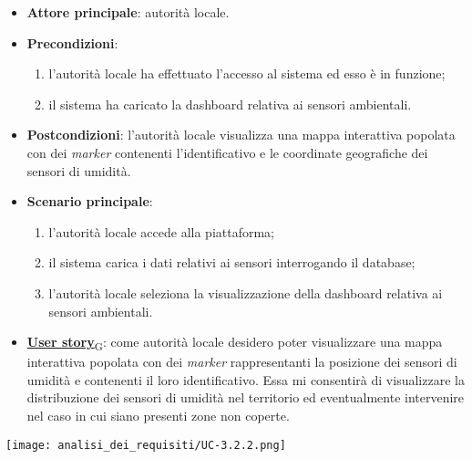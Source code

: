 \begin{itemize}
	\item \textbf{Attore principale}: autorità locale.
	\item \textbf{Precondizioni}:
	      \begin{enumerate}
		      \item l'autorità locale ha effettuato l'accesso al sistema ed esso è in funzione;
		      \item il sistema ha caricato la dashboard relativa ai sensori ambientali.
	      \end{enumerate}
	\item \textbf{Postcondizioni}: l'autorità locale visualizza una mappa interattiva popolata con dei \textit{marker} contenenti l'identificativo e le coordinate geografiche dei sensori di umidità.
	\item \textbf{Scenario principale}:
	      \begin{enumerate}
		      \item l'autorità locale accede alla piattaforma;
		      \item il sistema carica i dati relativi ai sensori interrogando il database;
		      \item l'autorità locale seleziona la visualizzazione della dashboard relativa ai sensori ambientali.
	      \end{enumerate}
	\item \href{https://7last.github.io/docs/pb/documentazione-interna/glossario\#user-story}{\textbf{User story}\textsubscript{G}}:
	      come autorità locale desidero poter visualizzare una mappa interattiva popolata con dei \textit{marker} rappresentanti la posizione dei sensori di umidità
	      e contenenti il loro identificativo. Essa mi consentirà di visualizzare la distribuzione dei sensori di umidità nel territorio ed eventualmente intervenire nel caso in cui siano presenti zone non coperte.
\end{itemize}
\begin{center}
	\texttt{[image: analisi\_dei\_requisiti/UC-3.2.2.png]}
\end{center}


